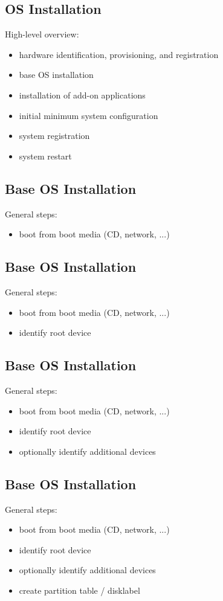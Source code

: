 \documentclass[xga]{xdvislides}
\begin{document}
\subsection{OS Installation}
High-level overview:
\begin{itemize}
	\item hardware identification, provisioning, and registration
	\item base OS installation
	\item installation of add-on applications
	\item initial minimum system configuration
	\item system registration
	\item system restart
\end{itemize}


\subsection{Base OS Installation}
General steps:
\begin{itemize}
	\item boot from boot media (CD, network, ...)
\end{itemize}

\subsection{Base OS Installation}
General steps:
\begin{itemize}
	\item boot from boot media (CD, network, ...)
	\item identify root device
\end{itemize}

\subsection{Base OS Installation}
General steps:
\begin{itemize}
	\item boot from boot media (CD, network, ...)
	\item identify root device
	\item optionally identify additional devices
\end{itemize}

\subsection{Base OS Installation}
General steps:
\begin{itemize}
	\item boot from boot media (CD, network, ...)
	\item identify root device
	\item optionally identify additional devices
	\item create partition table / disklabel
\end{itemize}
\end{document}
